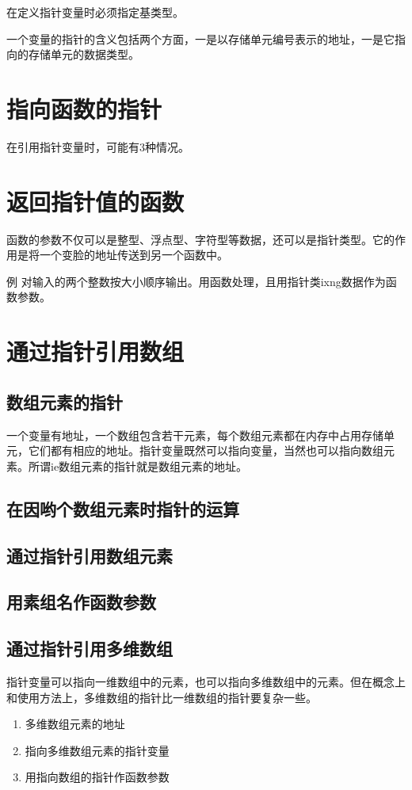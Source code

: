 在定义指针变量时必须指定基类型。

一个变量的指针的含义包括两个方面，一是以存储单元编号表示的地址，一是它指向的存储单元的数据类型。
\section{指向函数的指针}
在引用指针变量时，可能有3种情况。
\section{返回指针值的函数}
函数的参数不仅可以是整型、浮点型、字符型等数据，还可以是指针类型。它的作用是将一个变脸的地址传送到另一个函数中。

例 对输入的两个整数按大小顺序输出。用函数处理，且用指针类ixng数据作为函数参数。
\section{通过指针引用数组}
\subsection{数组元素的指针}
一个变量有地址，一个数组包含若干元素，每个数组元素都在内存中占用存储单元，它们都有相应的地址。指针变量既然可以指向变量，当然也可以指向数组元素。所谓ie数组元素的指针就是数组元素的地址。
\subsection{在因哟个数组元素时指针的运算}
\subsection{通过指针引用数组元素}
\subsection{用素组名作函数参数}
\subsection{通过指针引用多维数组}
指针变量可以指向一维数组中的元素，也可以指向多维数组中的元素。但在概念上和使用方法上，多维数组的指针比一维数组的指针要复杂一些。
\begin{enumerate}
	\item 多维数组元素的地址

	\item 指向多维数组元素的指针变量
	\item 用指向数组的指针作函数参数
\end{enumerate}
